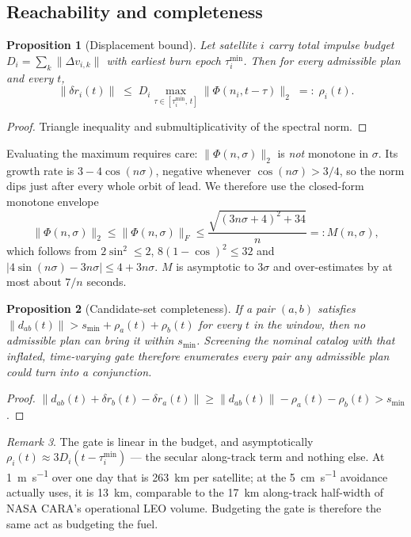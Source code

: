 \documentclass[11pt]{article}
\newtheorem{proposition}{Proposition}
\theoremstyle{definition}
\theoremstyle{remark}
\newtheorem{remark}[proposition]{Remark}
\newcommand{\dv}{\Delta v}
\newcommand{\norm}[1]{\lVert #1 \rVert}
\begin{document}
\subsection{Reachability and completeness}

\begin{proposition}[Displacement bound]
\label{prop:reach}
Let satellite $i$ carry total impulse budget $D_i = \sum_k \norm{\dv_{i,k}}$
with earliest burn epoch $\tau_i^{\min}$. Then for every admissible plan and
every $t$,
\begin{equation}
\norm{\delta r_i(t)} \;\le\; D_i \max_{\tau \in [\tau_i^{\min},\,t]} \norm{\Phi(n_i, t-\tau)}_2
\;=:\; \rho_i(t).
\end{equation}
\end{proposition}

\begin{proof}
Triangle inequality and submultiplicativity of the spectral norm.
\end{proof}

Evaluating the maximum requires care: $\norm{\Phi(n,\sigma)}_2$ is \emph{not}
monotone in $\sigma$. Its growth rate is $3 - 4\cos(n\sigma)$, negative
whenever $\cos(n\sigma) > 3/4$, so the norm dips just after every whole orbit
of lead. We therefore use the closed-form monotone envelope
\begin{equation}
\norm{\Phi(n,\sigma)}_2 \le \norm{\Phi(n,\sigma)}_F \le
\frac{\sqrt{(3n\sigma+4)^2 + 34}}{n} =: M(n,\sigma),
\label{eq:envelope}
\end{equation}
which follows from $2\sin^2 \le 2$, $8(1-\cos)^2 \le 32$ and
$|4\sin(n\sigma) - 3n\sigma| \le 4 + 3n\sigma$. $M$ is asymptotic to $3\sigma$
and over-estimates by at most about $7/n$ seconds.

\begin{proposition}[Candidate-set completeness]
\label{prop:complete}
If a pair $(a,b)$ satisfies
$\norm{d_{ab}(t)} > s_{\min} + \rho_a(t) + \rho_b(t)$ for every $t$ in the
window, then no admissible plan can bring it within $s_{\min}$. Screening the
\emph{nominal} catalog with that inflated, time-varying gate therefore
enumerates every pair any admissible plan could turn into a conjunction.
\end{proposition}

\begin{proof}
$\norm{d_{ab}(t) + \delta r_b(t) - \delta r_a(t)} \ge \norm{d_{ab}(t)} -
\rho_a(t) - \rho_b(t) > s_{\min}$.
\end{proof}

\begin{remark}
The gate is linear in the budget, and asymptotically $\rho_i(t) \approx
3 D_i (t - \tau_i^{\min})$ --- the secular along-track term and nothing else.
At \SI{1}{\meter\per\second} over one day that is \SI{263}{\kilo\meter} per
satellite; at the \SI{5}{\centi\meter\per\second} avoidance actually uses, it
is \SI{13}{\kilo\meter}, comparable to the \SI{17}{\kilo\meter} along-track
half-width of NASA CARA's operational LEO volume. Budgeting the gate is
therefore the same act as budgeting the fuel.
\end{remark}
\end{document}
